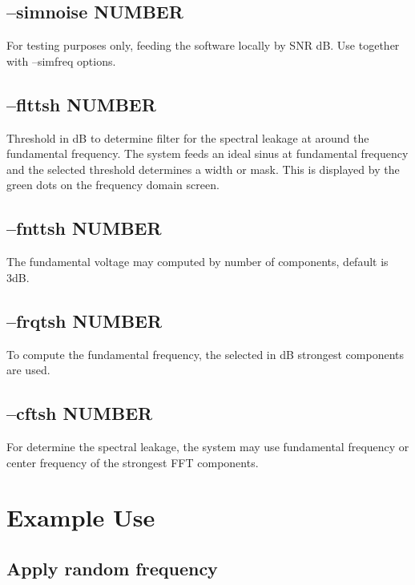\documentclass[10pt,a4paper]{article}
\begin{document}
\subsection{--simnoise NUMBER}
For testing purposes only, feeding the software locally by SNR dB. Use together with --simfreq options.
\subsection{--flttsh NUMBER}
Threshold in dB to determine filter for the spectral leakage at around the fundamental frequency. The system feeds an ideal sinus at fundamental frequency and the selected threshold determines a width or mask. This is displayed by the green dots on the frequency domain screen.
\subsection{--fnttsh NUMBER}
The fundamental voltage may computed by number of components, default is 3dB.
\subsection{--frqtsh NUMBER}
To compute the fundamental frequency, the selected in dB strongest components are used.
\subsection{--cftsh NUMBER}
For determine the spectral leakage, the system may use fundamental frequency or center frequency of the strongest FFT components.
\section{Example Use}

\subsection{Apply random frequency}
\end{document}
